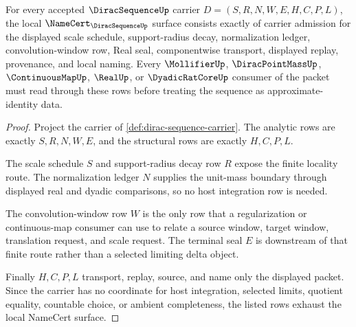 \begin{theorem}
\label{thm:dirac-sequence-namecert-obligations}
For every accepted $\DiracSequenceUp$ carrier $D=(S,R,N,W,E,H,C,P,L)$, the local $\NameCert_{\DiracSequenceUp}$ surface consists exactly of carrier admission for the displayed scale schedule, support-radius decay, normalization ledger, convolution-window row, Real seal, componentwise transport, displayed replay, provenance, and local naming. Every $\MollifierUp$, $\DiracPointMassUp$, $\ContinuousMapUp$, $\RealUp$, or $\DyadicRatCoreUp$ consumer of the packet must read through these rows before treating the sequence as approximate-identity data.
\end{theorem}
\begin{proof}
Project the carrier of \autoref{def:dirac-sequence-carrier}. The analytic rows are exactly $S,R,N,W,E$, and the structural rows are exactly $H,C,P,L$.

The scale schedule $S$ and support-radius decay row $R$ expose the finite locality route. The normalization ledger $N$ supplies the unit-mass boundary through displayed real and dyadic comparisons, so no host integration row is needed.

The convolution-window row $W$ is the only row that a regularization or continuous-map consumer can use to relate a source window, target window, translation request, and scale request. The terminal seal $E$ is downstream of that finite route rather than a selected limiting delta object.

Finally $H,C,P,L$ transport, replay, source, and name only the displayed packet. Since the carrier has no coordinate for host integration, selected limits, quotient equality, countable choice, or ambient completeness, the listed rows exhaust the local NameCert surface.
\end{proof}

